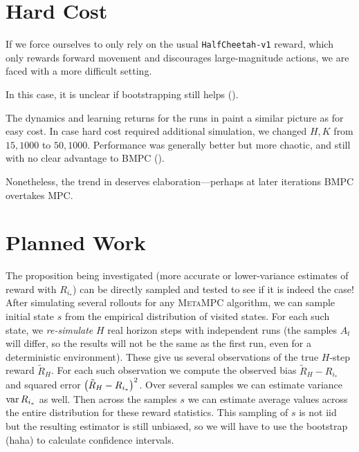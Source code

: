 \documentclass{article}
\begin{document}
\section{Hard Cost}

If we force ourselves to only rely on the usual \texttt{HalfCheetah-v1} reward, which only rewards forward movement and discourages large-magnitude actions, we are faced with a more difficult setting.

In this case, it is unclear if bootstrapping still helps ().


The dynamics and learning returns for the runs in  paint a similar picture as for easy cost. In case hard cost required additional simulation, we changed $H,K$ from $15,1000$ to $50,1000$. Performance was generally better but more chaotic, and still with no clear advantage to \textsc{BMPC} ().


Nonetheless, the trend in  deserves elaboration---perhaps at later iterations \textsc{BMPC} overtakes MPC.

\section{Planned Work}

The proposition being investigated (more accurate or lower-variance estimates of reward with $R_{i_*}$) can be directly sampled and tested to see if it is indeed the case! After simulating several rollouts for any \textsc{MetaMPC} algorithm, we can sample initial state $s$ from the empirical distribution of visited states. For each such state, we \textit{re-simulate} $H$ real horizon steps with independent runs (the samples $A_t$ will differ, so the results will not be the same as the first run, even for a deterministic environment). These give us several observations of the true $H$-step reward $\tilde{R}_H$. For each such observation we compute the observed bias $\tilde{R}_H-R_{i_*}$ and squared error $\left({\tilde{R}_H-R_{i_*}}\right)^2$. Over several samples we can estimate variance $\operatorname{var} R_{i_*}$ as well. Then across the samples $s$ we can estimate average values across the entire distribution for these reward statistics. This sampling of $s$ is not iid but the resulting estimator is still unbiased, so we will have to use the bootstrap (haha) to calculate confidence intervals.
\end{document}
